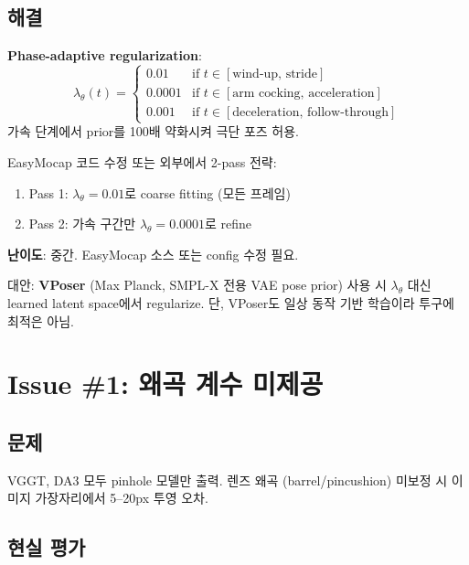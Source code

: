 \documentclass[11pt, a4paper]{report}
\begin{document}
\subsection{해결}

\begin{mathbox}
\textbf{Phase-adaptive regularization}:
\begin{equation}
\lambda_\theta(t) = \begin{cases}
0.01 & \text{if } t \in [\text{wind-up, stride}] \\
0.0001 & \text{if } t \in [\text{arm cocking, acceleration}] \\
0.001 & \text{if } t \in [\text{deceleration, follow-through}]
\end{cases}
\end{equation}
가속 단계에서 prior를 100배 약화시켜 극단 포즈 허용.
\end{mathbox}

\begin{devbox}
EasyMocap 코드 수정 또는 외부에서 2-pass 전략:
\begin{enumerate}[leftmargin=*]
  \item Pass 1: $\lambda_\theta = 0.01$로 coarse fitting (모든 프레임)
  \item Pass 2: 가속 구간만 $\lambda_\theta = 0.0001$로 refine
\end{enumerate}
\textbf{난이도}: 중간. EasyMocap 소스 또는 config 수정 필요.
\end{devbox}

\begin{ossbox}
대안: \textbf{VPoser} (Max Planck, SMPL-X 전용 VAE pose prior) 사용 시 $\lambda_\theta$ 대신 learned latent space에서 regularize. 단, VPoser도 일상 동작 기반 학습이라 투구에 최적은 아님.
\end{ossbox}


\section{Issue \#1: 왜곡 계수 미제공}

\subsection{문제}
VGGT, DA3 모두 pinhole 모델만 출력. 렌즈 왜곡 (barrel/pincushion) 미보정 시 이미지 가장자리에서 5--20px 투영 오차.

\subsection{현실 평가}
\end{document}
